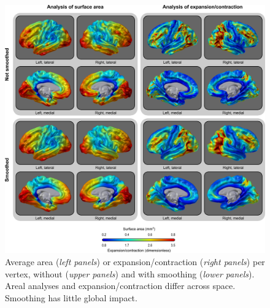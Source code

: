 \begin{figure}[!tp]  %
\centering
\includegraphics[width=14cm]{images/expansion.png}
\caption[Comparison with expansion/contraction methods (\textsc{i}).]{Average area (\emph{left panels}) or expansion/contraction (\emph{right panels}) per vertex, without (\emph{upper panels}) and with smoothing (\emph{lower panels}). Areal analyses and expansion/contraction differ across space. Smoothing has little global impact.}
\label{fig:areal:expansion}
\end{figure}


